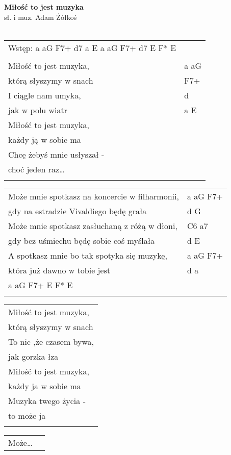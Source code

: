 \documentclass[a5paper]{article}
\begin{document}


\noindent
\fontsize{12pt}{15pt}\selectfont
\textbf{Miłość to jest muzyka} \\
\fontsize{8pt}{10pt}\selectfont
sł. i muz. Adam Żółkoś \\ \\
\fontsize{10pt}{12pt}\selectfont
{}
\begin{tabular}{@{}p{8.50cm}p{3cm}@{}}
\noindent
Wstęp: a aG F7+ d7 a E a aG F7+ d7 E F* E & \\ \\

Miłość to jest muzyka, & a aG \\
którą słyszymy w snach & F7+ \\
I ciągle nam umyka, & d \\
jak w polu wiatr & a E \\
Miłość to jest muzyka, & \\
każdy ją w sobie ma & \\
Chcę żebyś mnie usłyszał - & \\
choć jeden raz… & \\ \\
\end{tabular}

\noindent
\begin{tabular}{@{}p{7.50cm}p{3cm}@{}}
Może mnie spotkasz na koncercie w filharmonii, & a aG F7+ \\
gdy na estradzie Vivaldiego będę grała & d G \\
Może mnie spotkasz zasłuchaną z różą w dłoni, & C6 a7 \\ 
gdy bez uśmiechu będę sobie coś myślała & d E \\
A spotkasz mnie bo tak spotyka się muzykę, & a aG F7+ \\
która już dawno w tobie jest & d a \\
a aG F7+ E F* E & \\ \\
\end{tabular}

\noindent
\begin{tabular}{@{}p{8.50cm}@{}}		
Miłość to jest muzyka, \\
którą słyszymy w snach \\
To nic ,że czasem bywa, \\
jak gorzka łza \\
Miłość to jest muzyka, \\
każdy ja w sobie ma \\
Muzyka twego życia - \\
to może ja \\ \\
\end{tabular}

\noindent
\begin{tabular}{@{}p{7.50cm}p{3cm}@{}}
Może…
\end{tabular}
\end{document}
